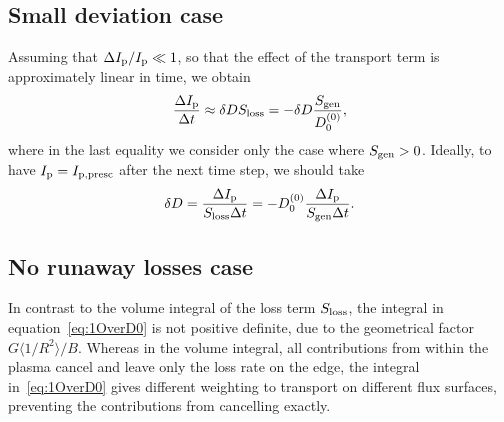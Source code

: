 \documentclass{notes}
\begin{document}
	\subsection{Small deviation case}
	Assuming that $\Delta I_{\rm p}/I_{\rm p}\ll 1$, so that the effect of
	the transport term is approximately linear in time, we obtain
	\begin{equation}
		\frac{\Delta I_{\rm p}}{\Delta t}\approx
			\delta D S_{\rm loss} = -\delta D\frac{S_{\rm gen}}{D_0^{(0)}},
	\end{equation}
	where in the last equality we consider only the case where $S_{\rm gen}>0$.
	Ideally, to have $I_{\rm p} = I_{\rm p,presc}$ after the next time step, we
	should take
	\begin{equation}
		\delta D = \frac{\Delta I_{\rm p}}{S_{\rm loss}\Delta t} = -D_0^{(0)} \frac{\Delta I_{\rm p}}{S_{\rm gen}\Delta t}.
	\end{equation}


	\subsection{No runaway losses case}
	In contrast to the volume integral of the loss term $S_{\rm loss}$, the
	integral in equation~\eqref{eq:1OverD0} is not positive definite, due to the
	geometrical factor $G\langle 1/R^2\rangle/B$. Whereas in the volume
	integral, all contributions from within the plasma cancel and leave only the
	loss rate on the edge, the integral in~\eqref{eq:1OverD0} gives different
	weighting to transport on different flux surfaces, preventing the
	contributions from cancelling exactly.
\end{document}
